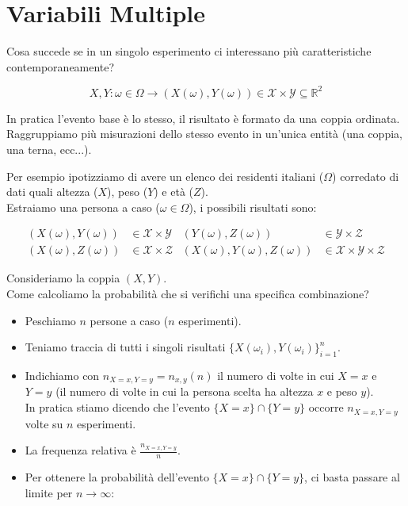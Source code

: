 
\section{Variabili Multiple}

Cosa succede se in un singolo esperimento ci interessano più caratteristiche contemporaneamente?

\begin{equation}
X, Y : \omega \in \Omega \longrightarrow (X(\omega), Y(\omega)) \in \mathcal{X} \times \mathcal{Y} \subseteq \mathbb{R}^2
\end{equation}

In pratica l'evento base è lo stesso, il risultato è formato da una coppia ordinata. Raggruppiamo più misurazioni dello stesso evento in un'unica entità (una coppia, una terna, ecc...).

Per esempio ipotizziamo di avere un elenco dei residenti italiani ($\Omega$) corredato di dati quali altezza ($X$), peso ($Y$) e età ($Z$).
\\Estraiamo una persona a caso ($\omega \in \Omega$), i possibili risultati sono:

\begin{align*}
(X(\omega), Y(\omega)) &\in \mathcal{X} \times \mathcal{Y} & (Y(\omega), Z(\omega)) &\in \mathcal{Y} \times \mathcal{Z} \\
(X(\omega), Z(\omega)) &\in \mathcal{X} \times \mathcal{Z} & (X(\omega), Y(\omega), Z(\omega)) &\in \mathcal{X} \times \mathcal{Y} \times \mathcal{Z}
\end{align*}

Consideriamo la coppia $(X, Y)$.
\\Come calcoliamo la probabilità che si verifichi una specifica combinazione?

\begin{itemize}
    \item Peschiamo $n$ persone a caso ($n$ esperimenti).
    \item Teniamo traccia di tutti i singoli risultati $\{X(\omega_i), Y(\omega_i)\}_{i=1}^n$.
    \item Indichiamo con $n_{X=x, Y=y} = n_{x,y}(n)$ il numero di volte in cui $X=x$ e $Y=y$ (il numero di volte in cui la persona scelta ha altezza $x$ e peso $y$).
    \\In pratica stiamo dicendo che l'evento $\{X=x\} \cap \{Y=y\}$ occorre $n_{X=x, Y=y}$ volte su $n$ esperimenti.
    \item La frequenza relativa è $\frac{n_{X=x, Y=y}}{n}$.
    \item Per ottenere la probabilità dell'evento $\{X=x\} \cap \{Y=y\}$, ci basta passare al limite per $n \to \infty$:
\end{itemize}


